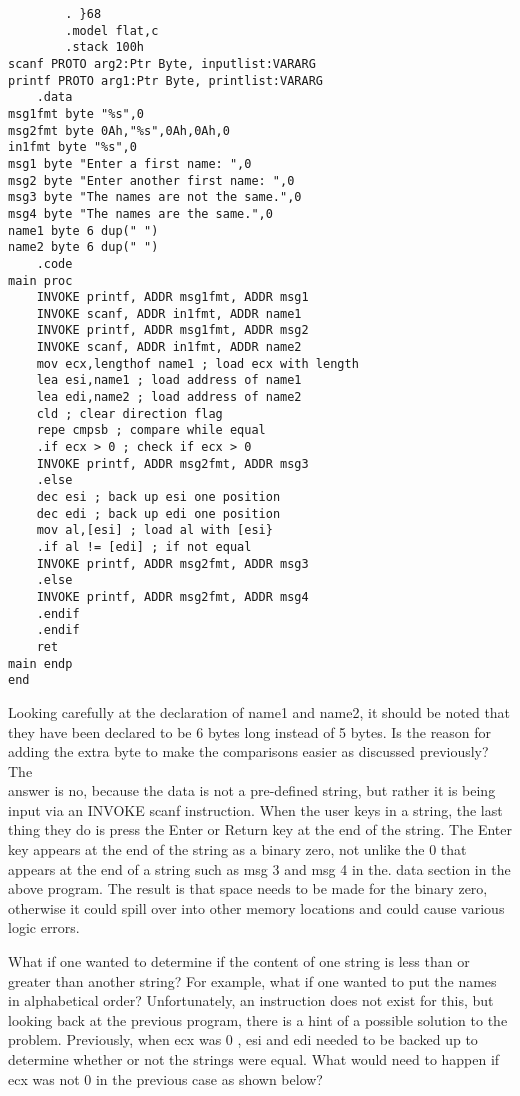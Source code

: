 \documentclass[10pt]{article}
\begin{document}
\begin{verbatim}
        . }68
        .model flat,c
        .stack 100h
scanf PROTO arg2:Ptr Byte, inputlist:VARARG
printf PROTO arg1:Ptr Byte, printlist:VARARG
    .data
msg1fmt byte "%s",0
msg2fmt byte 0Ah,"%s",0Ah,0Ah,0
in1fmt byte "%s",0
msg1 byte "Enter a first name: ",0
msg2 byte "Enter another first name: ",0
msg3 byte "The names are not the same.",0
msg4 byte "The names are the same.",0
name1 byte 6 dup(" ")
name2 byte 6 dup(" ")
    .code
main proc
    INVOKE printf, ADDR msg1fmt, ADDR msg1
    INVOKE scanf, ADDR in1fmt, ADDR name1
    INVOKE printf, ADDR msg1fmt, ADDR msg2
    INVOKE scanf, ADDR in1fmt, ADDR name2
    mov ecx,lengthof name1 ; load ecx with length
    lea esi,name1 ; load address of name1
    lea edi,name2 ; load address of name2
    cld ; clear direction flag
    repe cmpsb ; compare while equal
    .if ecx > 0 ; check if ecx > 0
    INVOKE printf, ADDR msg2fmt, ADDR msg3
    .else
    dec esi ; back up esi one position
    dec edi ; back up edi one position
    mov al,[esi] ; load al with [esi}
    .if al != [edi] ; if not equal
    INVOKE printf, ADDR msg2fmt, ADDR msg3
    .else
    INVOKE printf, ADDR msg2fmt, ADDR msg4
    .endif
    .endif
    ret
main endp
end
\end{verbatim}

Looking carefully at the declaration of name1 and name2, it should be noted that they have been declared to be 6 bytes long instead of 5 bytes. Is the reason for adding the extra byte to make the comparisons easier as discussed previously? The\\
answer is no, because the data is not a pre-defined string, but rather it is being input via an INVOKE scanf instruction. When the user keys in a string, the last thing they do is press the Enter or Return key at the end of the string. The Enter key appears at the end of the string as a binary zero, not unlike the 0 that appears at the end of a string such as msg 3 and msg 4 in the. data section in the above program. The result is that space needs to be made for the binary zero, otherwise it could spill over into other memory locations and could cause various logic errors.

What if one wanted to determine if the content of one string is less than or greater than another string? For example, what if one wanted to put the names in alphabetical order? Unfortunately, an instruction does not exist for this, but looking back at the previous program, there is a hint of a possible solution to the problem. Previously, when ecx was 0 , esi and edi needed to be backed up to determine whether or not the strings were equal. What would need to happen if ecx was not 0 in the previous case as shown below?
\end{document}
